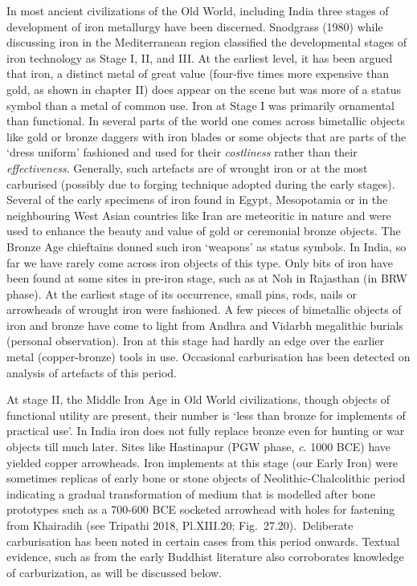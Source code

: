 In most ancient civilizations of the Old World, including India three stages of development of iron metallurgy have been discerned. Snodgrass (1980) while discussing iron in the Mediterranean region classified the developmental stages of iron technology as Stage I, II, and III.  At the earliest level, it has been argued that iron, a distinct metal of great value (four-five times more expensive than gold, as shown in chapter II) does appear on the scene but was more of a status symbol than a metal of common use. Iron at Stage I was primarily ornamental than functional. In several parts of the world one comes across bimetallic objects like gold or bronze daggers with iron blades or some objects that are parts of the ‘dress uniform’ fashioned and used for their {\it costliness} rather than their {\it effectiveness}. Generally, such artefacts are of wrought iron or at the most carburised (possibly due to forging technique adopted during the early stages). Several of the early specimens of iron found in Egypt, Mesopotamia or in the neighbouring West Asian countries like Iran are meteoritic in nature and were used to enhance the beauty and value of gold or ceremonial bronze objects. The Bronze Age chieftains donned such iron ‘weapons’ as status symbols. In India, so far we have rarely come across iron objects of this type. Only bits of iron have been found at some sites in pre-iron stage, such as at Noh in Rajasthan (in BRW phase). At the earliest stage of its occurrence, small pins, rods, nails or arrowheads of wrought iron were fashioned. A few pieces of bimetallic objects of iron and bronze have come to light from Andhra and Vidarbh megalithic burials (personal observation). Iron at this stage had hardly an edge over the earlier metal (copper-bronze) tools in use. Occasional carburisation has been detected on analysis of artefacts of this period.

At stage II, the Middle Iron Age in Old World civilizations, though objects of functional utility are present, their number is ‘less than bronze for implements of practical use’. In India iron does not fully replace bronze even for hunting or war objects till much later. Sites like Hastinapur (PGW phase, {\it  c}. 1000 BCE) have yielded copper arrowheads. Iron implements at this stage (our Early Iron) were sometimes replicas of early bone or stone objects of Neolithic-Chalcolithic period indicating a gradual transformation of medium that is modelled after bone prototypes such as a 700-600 BCE socketed arrowhead with holes for fastening from Khairadih (see Tripathi 2018, Pl.XIII.20; Fig.~27.20).~Deliberate carburisation has been noted in certain cases from this period onwards. Textual evidence, such as from the early Buddhist literature also corroborates knowledge of carburization, as will be discussed below. 

